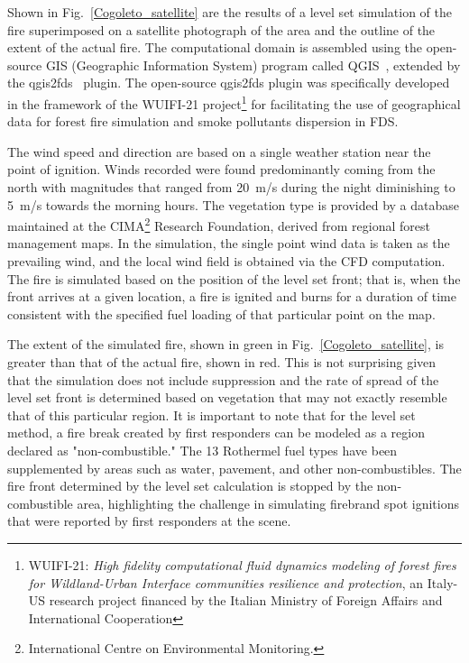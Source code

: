 \documentclass[journal,article,atmosphere,submit,moreauthors,pdftex]{Definitions_Review_Process/mdpi}
\begin{document}
Shown in Fig.~\ref{Cogoleto_satellite} are the results of a level set simulation of the fire superimposed on a satellite photograph of the area and the outline of the extent of the actual fire. The computational domain is assembled using the open-source GIS (Geographic Information System) program called QGIS~\cite{QGIS}, extended by the qgis2fds~\cite{qgis2fds} plugin. The open-source qgis2fds plugin was specifically developed in the framework of the WUIFI-21 project\footnote{WUIFI-21: {\it High fidelity computational fluid dynamics modeling of forest fires for Wildland-Urban Interface communities resilience and protection}, an Italy-US research project financed by the Italian Ministry of Foreign Affairs and International Cooperation} for facilitating the use of geographical data for forest fire simulation and smoke pollutants dispersion in FDS.

The wind speed and direction are based on a single weather station near the point of ignition. Winds recorded were found predominantly coming from the north with magnitudes that ranged from 20~m/s during the night diminishing to 5~m/s towards the morning hours. The vegetation type is provided by a database maintained at the CIMA\footnote{International Centre on Environmental Monitoring.} Research Foundation, derived from regional forest management maps. In the simulation, the single point wind data is taken as the prevailing wind, and the local wind field is obtained via the CFD computation. The fire is simulated based on the position of the level set front; that is, when the front arrives at a given location, a fire is ignited and burns for a duration of time consistent with the specified fuel loading of that particular point on the map. 

The extent of the simulated fire, shown in green in Fig.~\ref{Cogoleto_satellite}, is greater than that of the actual fire, shown in red. This is not surprising given that the simulation does not include suppression and the rate of spread of the level set front is determined based on vegetation that may not exactly resemble that of this particular region. It is important to note that for the level set method, a fire break created by first responders can be modeled as a region declared as "non-combustible." The 13 Rothermel fuel types have been supplemented by areas such as water, pavement, and other non-combustibles. The fire front determined by the level set calculation is stopped by the non-combustible area, highlighting the challenge in simulating firebrand spot ignitions that were reported by first responders at the scene.
\end{document}
